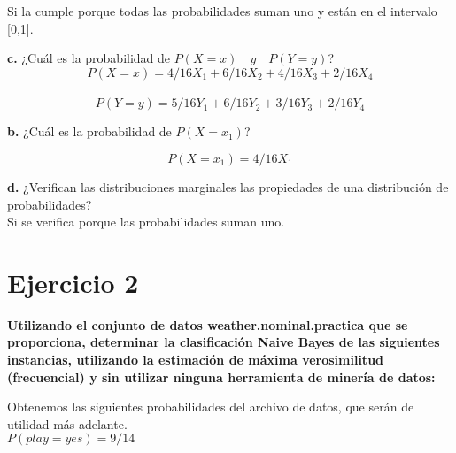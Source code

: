 \documentclass{article}
\begin{document}
\hspace{1.5cm}Si la cumple porque todas las probabilidades suman uno y están en el intervalo [0,1].

\vspace{1cm}

\hspace{0.5cm} \textbf{c.} \hspace{0.5cm} ¿Cuál es la probabilidad de $P(X = x) \quad y \quad P(Y = y)$? \\ 

$$P(X = x) = 4/16 X_1 + 6/16 X_2 + 4/16 X_3 + 2/16 X_4 $$ \\
$$P(Y = y) = 5/16 Y_1 + 6/16 Y_2 + 3/16 Y_3 + 2/16 Y_4 $$ 

\vspace{1cm}

\hspace{0.5cm} \textbf{b.} \hspace{0.5cm}  ¿Cuál es la probabilidad de $P(X = x_1)$?

$$P(X = x_1) = 4/16 X_1 $$ 

\vspace{1cm}

\hspace{0.5cm} \textbf{d.} \hspace{0.5cm} ¿Verifican las distribuciones marginales las propiedades de una distribución de probabilidades? \\

\hspace{1.5cm} Si se verifica porque las probabilidades suman uno.

\newpage

\section{Ejercicio 2}

\textbf{Utilizando el conjunto de datos weather.nominal.practica que se proporciona, determinar la clasificación Naive Bayes de las siguientes instancias, utilizando la estimación de máxima
verosimilitud (frecuencial) y sin utilizar ninguna herramienta de minería de datos:}
\vspace{1cm}

Obtenemos las siguientes probabilidades del archivo de datos, que serán de utilidad más adelante.\\

\hspace{1cm} $P(play = yes) = 9/14$\\
\end{document}
